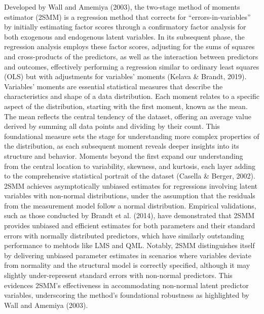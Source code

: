 \documentclass[
  man]{apa6}
\begin{document}
Developed by Wall and Amemiya (2003), the two-stage method of moments estimator (2SMM) is a regression method that corrects for ``errors-in-variables'' by initially estimating factor scores through a confirmatory factor analysis for both exogenous and endogenous latent variables. In its subsequent phase, the regression analysis employs these factor scores, adjusting for the sums of squares and cross-products of the predictors, as well as the interaction between predictors and outcomes, effectively performing a regression similar to ordinary least squares (OLS) but with adjustments for variables' moments (Kelava \& Brandt, 2019). Variables' moments are essential statistical measures that describe the characteristics and shape of a data distribution. Each moment relates to a specific aspect of the distribution, starting with the first moment, known as the mean. The mean reflects the central tendency of the dataset, offering an average value derived by summing all data points and dividing by their count. This foundational measure sets the stage for understanding more complex properties of the distribution, as each subsequent moment reveals deeper insights into its structure and behavior. Moments beyond the first expand our understanding from the central location to variability, skewness, and kurtosis, each layer adding to the comprehensive statistical portrait of the dataset (Casella \& Berger, 2002). 2SMM achieves asymptotically unbiased estimates for regressions involving latent variables with non-normal distributions, under the assumption that the residuals from the measurement model follow a normal distribution. Empirical validations, such as those conducted by Brandt et al. (2014), have demonstrated that 2SMM provides unbiased and efficient estimates for both parameters and their standard errors with normally distributed predictors, which have similarly outstanding performance to mehtods like LMS and QML. Notably, 2SMM distinguishes itself by delivering unbiased parameter estimates in scenarios where variables deviate from normality and the structural model is correctly specified, although it may slightly under-represent standard errors with non-normal predictors. This evidences 2SMM's effectiveness in accommodating non-normal latent predictor variables, underscoring the method's foundational robustness as highlighted by Wall and Amemiya (2003).
\end{document}
